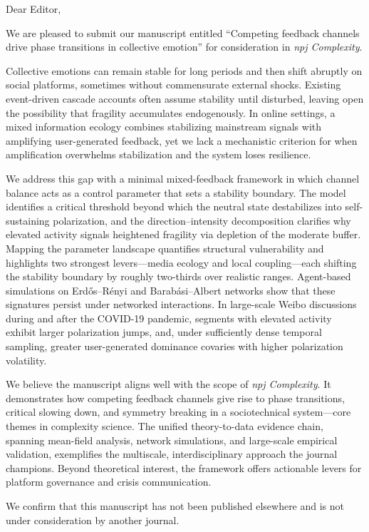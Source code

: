 \documentclass[11pt]{article}
\begin{document}
Dear Editor,

We are pleased to submit our manuscript entitled ``Competing feedback channels drive phase transitions in collective emotion'' for consideration in \textit{npj Complexity}.

Collective emotions can remain stable for long periods and then shift abruptly on social platforms, sometimes without commensurate external shocks. Existing event-driven cascade accounts often assume stability until disturbed, leaving open the possibility that fragility accumulates endogenously. In online settings, a mixed information ecology combines stabilizing mainstream signals with amplifying user-generated feedback, yet we lack a mechanistic criterion for when amplification overwhelms stabilization and the system loses resilience.

We address this gap with a minimal mixed-feedback framework in which channel balance acts as a control parameter that sets a stability boundary. The model identifies a critical threshold beyond which the neutral state destabilizes into self-sustaining polarization, and the direction--intensity decomposition clarifies why elevated activity signals heightened fragility via depletion of the moderate buffer. Mapping the parameter landscape quantifies structural vulnerability and highlights two strongest levers---media ecology and local coupling---each shifting the stability boundary by roughly two-thirds over realistic ranges. Agent-based simulations on Erd\H{o}s--R\'enyi and Barab\'asi--Albert networks show that these signatures persist under networked interactions. In large-scale Weibo discussions during and after the COVID-19 pandemic, segments with elevated activity exhibit larger polarization jumps, and, under sufficiently dense temporal sampling, greater user-generated dominance covaries with higher polarization volatility.

We believe the manuscript aligns well with the scope of \textit{npj Complexity}. It demonstrates how competing feedback channels give rise to phase transitions, critical slowing down, and symmetry breaking in a sociotechnical system---core themes in complexity science. The unified theory-to-data evidence chain, spanning mean-field analysis, network simulations, and large-scale empirical validation, exemplifies the multiscale, interdisciplinary approach the journal champions. Beyond theoretical interest, the framework offers actionable levers for platform governance and crisis communication.

We confirm that this manuscript has not been published elsewhere and is not under consideration by another journal.
\end{document}
